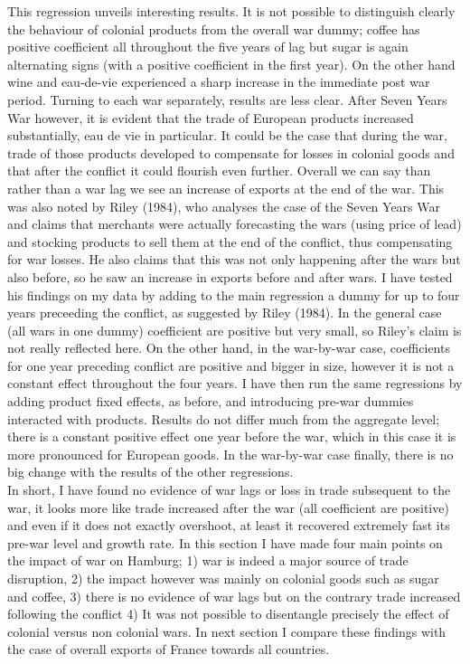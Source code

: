 \documentclass[12pt,a4paper,titlepage]{article}
\begin{document}
This regression unveils interesting results. It is not possible to distinguish clearly the behaviour of colonial products from the overall war dummy; coffee has positive coefficient all throughout the five years of lag but sugar is again alternating signs (with a positive coefficient in the first year). On the other hand wine and eau-de-vie experienced a sharp increase in the immediate post war period. Turning to each war separately, results are less clear. After Seven Years War however, it is evident that the trade of European products increased substantially, eau de vie in particular. It could be the case that during the war, trade of those products developed to compensate for losses in colonial goods and that after the conflict it could flourish even further. Overall we can say than rather than a war lag we see an increase of exports at the end of the war. This was also noted by Riley (1984), who analyses the case of the Seven Years War and claims that merchants were actually forecasting the wars (using price of lead) and stocking products to sell them at the end of the conflict, thus compensating for war losses. He also claims that this was not only happening after the wars but also before, so he saw an increase in exports before and after wars. I have tested his findings on my data by adding to the main regression a dummy for up to four years preceeding the conflict, as suggested by Riley (1984). In the general case (all wars in one dummy) coefficient are positive but very small, so Riley’s claim is not really reflected here. On the other hand, in the war-by-war case, coefficients for one year preceding conflict are positive and bigger in size, however it is not a constant effect throughout the four years. 
I have then run the same regressions by adding product fixed effects, as before, and introducing pre-war dummies interacted with products. Results do not differ much from the aggregate level; there is a constant positive effect one year before the war, which in this case it is more pronounced for European goods. In the war-by-war case finally, there is no big change with the results of the other regressions. \\
In short, I have found no evidence of war lags or loss in trade subsequent to the war, it looks more like trade increased after the war (all coefficient are positive) and even if it does not exactly overshoot, at least it recovered extremely fast its pre-war level and growth rate. 
In this section I have made four main points on the impact of war on Hamburg; 1) war is indeed a major source of trade disruption, 2) the impact however was mainly on colonial goods such as sugar and coffee, 3) there is no evidence of war lags but on the contrary trade increased following the conflict 4) It was not possible to disentangle precisely the effect of colonial versus non colonial wars. In next section I compare these findings with the case of overall exports of France towards all countries. 
\end{document}
